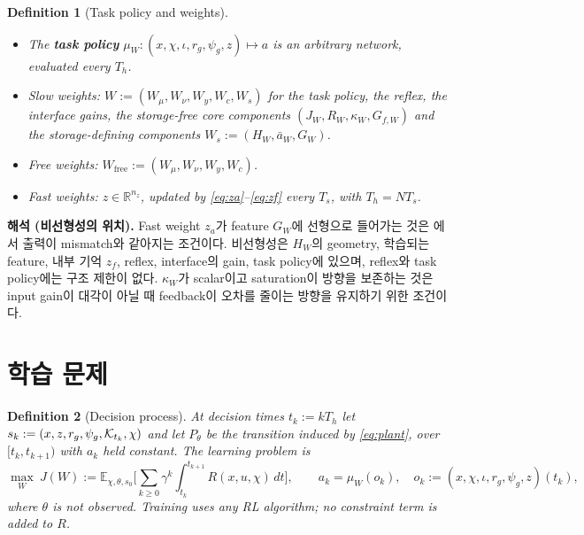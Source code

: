 \documentclass[11pt]{article}\usepackage[margin=1in]{geometry}\usepackage{amsmath,amssymb,amsthm,mathtools}\usepackage{graphicx}\graphicspath{{figures/}{../figures/}{figs/}{./}}\usepackage{enumitem}\usepackage{hyperref}\usepackage{cleveref}\usepackage{tikz}\usetikzlibrary{arrows.meta,positioning,calc,shapes.geometric}\usepackage{float}\usepackage{rotating}\usepackage[most]{tcolorbox}\usepackage{kotex}\usepackage{booktabs}\emergencystretch=1.6em\tolerance=2000 \crefname{assumption}{Assumption}{Assumptions}\Crefname{assumption}{Assumption}{Assumptions}\crefname{definition}{Definition}{Definitions}\Crefname{definition}{Definition}{Definitions}\crefname{proposition}{Proposition}{Propositions}\Crefname{proposition}{Proposition}{Propositions}\crefname{fact}{Fact}{Facts}\Crefname{fact}{Fact}{Facts} \newtheorem{assumption}{Assumption}\newtheorem{definition}{Definition}\newtheorem{lemma}{Lemma}\newtheorem{proposition}{Proposition}\newtheorem{theorem}{Theorem}\newtheorem{corollary}{Corollary}\newtheorem{fact}{Fact}\theoremstyle{remark}\newtheorem{remark}{Remark} \newcommand{\R}{\mathbb{R}}\newcommand{\xb}{\bar x}\newcommand{\Ab}{\bar A}\newcommand{\By}{\bar B_y}\newcommand{\U}{\mathcal U}\newcommand{\Z}{\mathcal Z}
\begin{document}
\begin{definition}[Task policy and weights]
\label{def:weights}
\begin{itemize}
\item The \textbf{\emph{task policy}} $\mu_W:(x,\chi,\iota,r_g,\psi_g,z)\mapsto a$ is an arbitrary network, evaluated every $T_h$.
\item Slow weights: $W:=(W_\mu,W_\nu,W_y,W_c,W_s)$ for the task policy, the reflex, the interface gains, the storage-free core components $(J_W,R_W,\kappa_W,G_{f,W})$ and the storage-defining components $W_s:=(H_W,\bar a_W,G_W)$.
\item Free weights: $W_{\mathrm{free}}:=(W_\mu,W_\nu,W_y,W_c)$.
\item Fast weights: $z\in\R^{n_z}$, updated by \eqref{eq:za}--\eqref{eq:zf} every $T_s$, with $T_h=NT_s$.
\end{itemize}
\end{definition}

\textbf{해석 (비선형성의 위치).} Fast weight $z_a$가 feature $G_W$에 선형으로 들어가는 것은 에서 출력이 mismatch와 같아지는 조건이다. 비선형성은 $H_W$의 geometry, 학습되는 feature, 내부 기억 $z_f$, reflex, interface의 gain, task policy에 있으며, reflex와 task policy에는 구조 제한이 없다. $\kappa_W$가 scalar이고 saturation이 방향을 보존하는 것은 input gain이 대각이 아닐 때 feedback이 오차를 줄이는 방향을 유지하기 위한 조건이다.


\section{학습 문제}
\label{sec:mdp}

\begin{definition}[Decision process]
\label{def:mdp}
At decision times $t_k:=kT_h$ let $s_k:=(x,z,r_g,\psi_g,\mathcal K_{t_k},\chi)$ and let $P_\theta$ be the transition induced by \eqref{eq:plant},  over $[t_k,t_{k+1})$ with $a_k$ held constant. The learning problem is
\[
\max_W\ J(W):=\mathbb E_{\chi,\theta,s_0}\Big[\sum_{k\ge0}\gamma^k\!\int_{t_k}^{t_{k+1}}\!R(x,u,\chi)\,dt\Big],\qquad a_k=\mu_W(o_k),\quad o_k:=(x,\chi,\iota,r_g,\psi_g,z)(t_k),
\]
where $\theta$ is not observed. Training uses any RL algorithm; no constraint term is added to $R$.
\end{definition}
\end{document}
